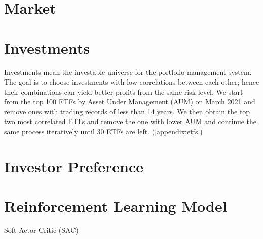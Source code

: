 \section{Market}
\section{Investments}
Investments mean the investable universe for the portfolio management system. The goal is to choose investments with low correlations between each other; hence their combinations can yield better profits from the same risk level. We start from the top 100 ETFs by Asset Under Management (AUM) on March 2021 and remove ones with trading records of less than 14 years. We then obtain the top two most correlated ETFs and remove the one with lower AUM and continue the same process iteratively until 30 ETFs are left.  (\autoref{appendix:etfs})
\par


\section{Investor Preference}
\section{Reinforcement Learning Model}
Soft Actor-Critic (SAC)\cite{haarnoja2018soft}